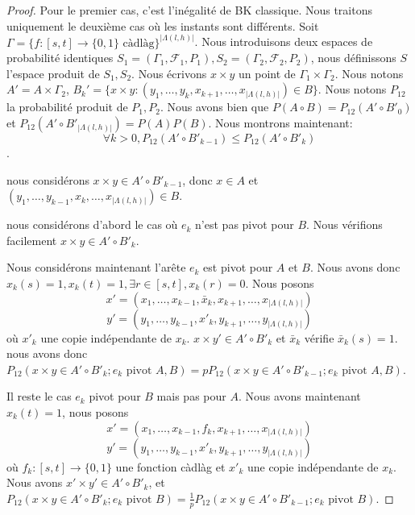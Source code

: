 \documentclass[titlepage,a4paper,12pt]{article}
\begin{document}
\begin{proof}
Pour le premier cas, c'est l'inégalité de BK classique. Nous traitons uniquement le deuxième cas où les instants sont différents. Soit $\Gamma = \{f:[s,t]\rightarrow\{0,1\}\text{ càdlàg} \}^{|\Lambda(l,h)|}$. Nous introduisons deux espaces de probabilité identiques $S_1 = (\Gamma_1,\mathcal{F}_1,P_1), S_2 = (\Gamma_2,\mathcal{F}_2,P_2)$, nous définissons $S$ l'espace produit de $S_1,S_2$. Nous écrivons $x\times y$ un point de $\Gamma_1 \times \Gamma_2$. Nous notons $A' = A\times \Gamma_2$, $B_k' = \{x\times y :(y_1,\dots,y_k,x_{k+1},\dots,x_{|\Lambda(l,h)|}) \in B\}$. Nous notons $P_{12}$ la probabilité produit de $P_1,P_2$. Nous avons bien que $P(A\circ B) = P_{12}(A'\circ B'_0)$ et $P_{12}(A'\circ B'_{|\Lambda(l,h)|}) = P(A)P(B)$. Nous montrons maintenant: $$\forall k>0, P_{12}(A'\circ B'_{k-1}) \leqslant P_{12}(A'\circ B'_k)$$. 

nous considérons $x\times y \in A'\circ B'_{k-1}$, donc $x\in A$ et $(y_1,\dots,y_{k-1},x_k,\dots,x_{|\Lambda(l,h)|})\in B$. 

nous considérons d'abord le cas où $e_k$ n'est pas pivot pour $B$. Nous vérifions facilement $x\times y \in A'\circ B'_k$.

Nous considérons maintenant l'arête $e_k$ est pivot pour $A$ et $B$. Nous avons donc $x_k(s) = 1, x_k(t) =1, \exists r\in [s,t], x_k(r) = 0$. Nous posons $$x'=(x_1,\dots,x_{k-1},\bar{x}_k,x_{k+1},\dots,x_{|\Lambda(l,h)|})$$
$$y'=(y_1,\dots,y_{k-1},x'_k,y_{k+1},\dots,y_{|\Lambda(l,h)|})$$ où $x'_k$ une copie indépendante de $x_k$. $x\times y' \in A'\circ B'_k$ et $\bar{x}_k$ vérifie $\bar{x}_k(s)=1$. nous avons donc $P_{12}(x\times y \in A'\circ B'_k; e_k \text{ pivot }A,B) = pP_{12}(x\times y \in A'\circ B'_{k-1}; e_k \text{ pivot }A,B)$.

Il reste le cas $e_k$ pivot pour $B$ mais pas pour $A$. Nous avons maintenant $x_k(t) = 1$, nous posons 
$$ x'=(x_1,\dots,x_{k-1},f_k,x_{k+1},\dots,x_{|\Lambda(l,h)|})
$$
$$y' =(y_1,\dots,y_{k-1},x'_k,y_{k+1},\dots,y_{|\Lambda(l,h)|})
$$
où $f_k:[s,t]\rightarrow\{0,1\}$ une fonction càdlàg et $x'_k$ une copie indépendante de $x_k$. Nous avons $x'\times y' \in A'\circ B'_k$, et $P_{12}(x\times y \in A'\circ B'_k; e_k \text{ pivot }B) = \frac{1}{p}P_{12}(x\times y \in A'\circ B'_{k-1}; e_k \text{ pivot }B)$.


\end{proof}
\end{document}
